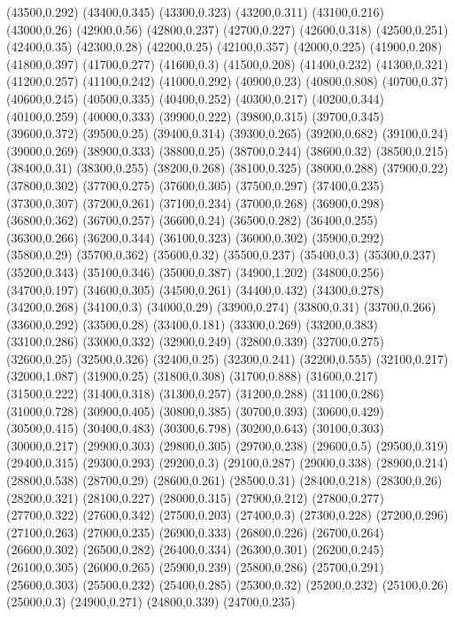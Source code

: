 (43500,0.292)
(43400,0.345)
(43300,0.323)
(43200,0.311)
(43100,0.216)
(43000,0.26)
(42900,0.56)
(42800,0.237)
(42700,0.227)
(42600,0.318)
(42500,0.251)
(42400,0.35)
(42300,0.28)
(42200,0.25)
(42100,0.357)
(42000,0.225)
(41900,0.208)
(41800,0.397)
(41700,0.277)
(41600,0.3)
(41500,0.208)
(41400,0.232)
(41300,0.321)
(41200,0.257)
(41100,0.242)
(41000,0.292)
(40900,0.23)
(40800,0.808)
(40700,0.37)
(40600,0.245)
(40500,0.335)
(40400,0.252)
(40300,0.217)
(40200,0.344)
(40100,0.259)
(40000,0.333)
(39900,0.222)
(39800,0.315)
(39700,0.345)
(39600,0.372)
(39500,0.25)
(39400,0.314)
(39300,0.265)
(39200,0.682)
(39100,0.24)
(39000,0.269)
(38900,0.333)
(38800,0.25)
(38700,0.244)
(38600,0.32)
(38500,0.215)
(38400,0.31)
(38300,0.255)
(38200,0.268)
(38100,0.325)
(38000,0.288)
(37900,0.22)
(37800,0.302)
(37700,0.275)
(37600,0.305)
(37500,0.297)
(37400,0.235)
(37300,0.307)
(37200,0.261)
(37100,0.234)
(37000,0.268)
(36900,0.298)
(36800,0.362)
(36700,0.257)
(36600,0.24)
(36500,0.282)
(36400,0.255)
(36300,0.266)
(36200,0.344)
(36100,0.323)
(36000,0.302)
(35900,0.292)
(35800,0.29)
(35700,0.362)
(35600,0.32)
(35500,0.237)
(35400,0.3)
(35300,0.237)
(35200,0.343)
(35100,0.346)
(35000,0.387)
(34900,1.202)
(34800,0.256)
(34700,0.197)
(34600,0.305)
(34500,0.261)
(34400,0.432)
(34300,0.278)
(34200,0.268)
(34100,0.3)
(34000,0.29)
(33900,0.274)
(33800,0.31)
(33700,0.266)
(33600,0.292)
(33500,0.28)
(33400,0.181)
(33300,0.269)
(33200,0.383)
(33100,0.286)
(33000,0.332)
(32900,0.249)
(32800,0.339)
(32700,0.275)
(32600,0.25)
(32500,0.326)
(32400,0.25)
(32300,0.241)
(32200,0.555)
(32100,0.217)
(32000,1.087)
(31900,0.25)
(31800,0.308)
(31700,0.888)
(31600,0.217)
(31500,0.222)
(31400,0.318)
(31300,0.257)
(31200,0.288)
(31100,0.286)
(31000,0.728)
(30900,0.405)
(30800,0.385)
(30700,0.393)
(30600,0.429)
(30500,0.415)
(30400,0.483)
(30300,6.798)
(30200,0.643)
(30100,0.303)
(30000,0.217)
(29900,0.303)
(29800,0.305)
(29700,0.238)
(29600,0.5)
(29500,0.319)
(29400,0.315)
(29300,0.293)
(29200,0.3)
(29100,0.287)
(29000,0.338)
(28900,0.214)
(28800,0.538)
(28700,0.29)
(28600,0.261)
(28500,0.31)
(28400,0.218)
(28300,0.26)
(28200,0.321)
(28100,0.227)
(28000,0.315)
(27900,0.212)
(27800,0.277)
(27700,0.322)
(27600,0.342)
(27500,0.203)
(27400,0.3)
(27300,0.228)
(27200,0.296)
(27100,0.263)
(27000,0.235)
(26900,0.333)
(26800,0.226)
(26700,0.264)
(26600,0.302)
(26500,0.282)
(26400,0.334)
(26300,0.301)
(26200,0.245)
(26100,0.305)
(26000,0.265)
(25900,0.239)
(25800,0.286)
(25700,0.291)
(25600,0.303)
(25500,0.232)
(25400,0.285)
(25300,0.32)
(25200,0.232)
(25100,0.26)
(25000,0.3)
(24900,0.271)
(24800,0.339)
(24700,0.235)
